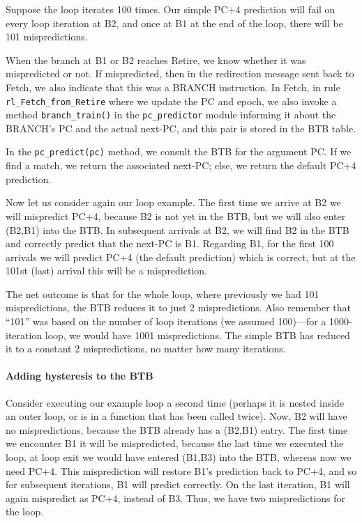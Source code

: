 Suppose the loop iterates 100 times. Our simple PC+4 prediction will
fail on every loop iteration at B2, and once at B1 at the end of the
loop, {\ie} there will be 101 mispredictions.

When the branch at B1 or B2 reaches Retire, we know whether it was
mispredicted or not.  If mispredicted, then in the redirection message
sent back to Fetch, we also indicate that this was a BRANCH
instruction. In Fetch, in rule \verb|rl_Fetch_from_Retire| where we
update the PC and epoch, we also invoke a method \verb|branch_train()|
in the \verb|pc_predictor| module informing it about the BRANCH's PC
and the actual next-PC, and this pair is stored in the BTB table.

In the \verb|pc_predict(pc)| method, we consult the BTB for the
argument PC.  If we find a match, we return the associated next-PC;
else, we return the default PC+4 prediction.

Now let us consider again our loop example.  The first time we arrive
at B2 we will mispredict PC+4, because B2 is not yet in the BTB, but
we will also enter (B2,B1) into the BTB.  In subsequent arrivals at
B2, we will find B2 in the BTB and correctly predict that the next-PC
is B1.  Regarding B1, for the first 100 arrivals we will predict PC+4
(the default prediction) which is correct, but at the 101st (last)
arrival this will be a misprediction.

The net outcome is that for the whole loop, where previously we had
101 mispredictions, the BTB reduces it to just 2 mispredictions.  Also
remember that ``101'' was based on the number of loop iterations (we
assumed 100)---for a 1000-iteration loop, we would have 1001
mispredictions.  The simple BTB has reduced it to a constant 2
mispredictions, no matter how many iterations.


\paragraph{Adding hysteresis to the BTB}

\label{Sec_BTBs_w_hysteresis}


Consider executing our example loop a second time (perhaps it is
nested inside an outer loop, or is in a function that has been called
twice).  Now, B2 will have no mispredictions, because the BTB already
has a (B2,B1) entry.  The first time we encounter B1 it will be
mispredicted, because the last time we executed the loop, at loop exit
we would have entered (B1,B3) into the BTB, whereas now we need PC+4.
This misprediction will restore B1's prediction back to PC+4, and so
for subsequent iterations, B1 will predict correctly. On the last
iteration, B1 will again mispredict as PC+4, instead of B3.  Thus, we
have two mispredictions for the loop.

